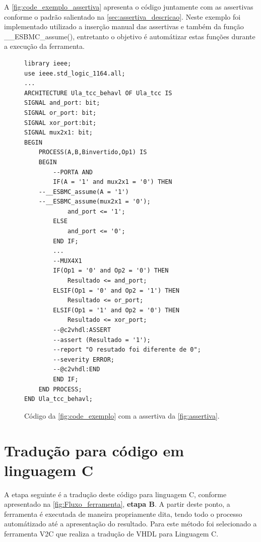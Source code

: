 \par
A \autoref{fig:code_exemplo_assertiva} apresenta o código juntamente com as assertivas conforme o padrão salientado na \autoref{sec:assertiva_descricao}. Neste exemplo foi implementado utilizado a inserção manual das assertivas e também da função \_\_ESBMC\_assume(), entretanto o objetivo é automátizar estas funções durante a execução da ferramenta.
\begin{figure}[h]
\caption{\label{fig:code_exemplo_assertiva} Código da \autoref{fig:code_exemplo} com a assertiva da \autoref{fig:assertiva}.}
	\begin{center}
    \begin{minipage}{0.99\textwidth}
    \begin{lstlisting}       
library ieee;
use ieee.std_logic_1164.all;
...
ARCHITECTURE Ula_tcc_behavl OF Ula_tcc IS
SIGNAL and_port: bit;
SIGNAL or_port: bit;
SIGNAL xor_port:bit;
SIGNAL mux2x1: bit;
BEGIN
	PROCESS(A,B,Binvertido,Op1) IS
	BEGIN
		--PORTA AND
		IF(A = '1' and mux2x1 = '0') THEN
    --__ESBMC_assume(A = '1')
    --__ESBMC_assume(mux2x1 = '0');
		    and_port <= '1';
		ELSE
		    and_port <= '0';
		END IF;
		...
		--MUX4X1
		IF(Op1 = '0' and Op2 = '0') THEN
			Resultado <= and_port;
		ELSIF(Op1 = '0' and Op2 = '1') THEN
			Resultado <= or_port;
		ELSIF(Op1 = '1' and Op2 = '0') THEN
			Resultado <= xor_port;
        --@c2vhdl:ASSERT
        --assert (Resultado = '1');
        --report "O resutado foi diferente de 0";
        --severity ERROR;
        --@c2vhdl:END
		END IF;
	END PROCESS;
END Ula_tcc_behavl;
    \end{lstlisting}
    \end{minipage}
	\end{center}
\end{figure}

\section{\label{cap:traducao}Tradução para código em linguagem C}
\par
A etapa seguinte é a tradução deste código para linguagem C, conforme apresentado na \autoref{fig:Fluxo_ferramenta}, \textbf{etapa B}. A partir deste ponto, a ferramenta é executada de maneira propriamente dita, tendo todo o processo automátizado até a apresentação do resultado. Para este método foi selecionado a ferramenta V2C que realiza a tradução de VHDL para Linguagem C.

